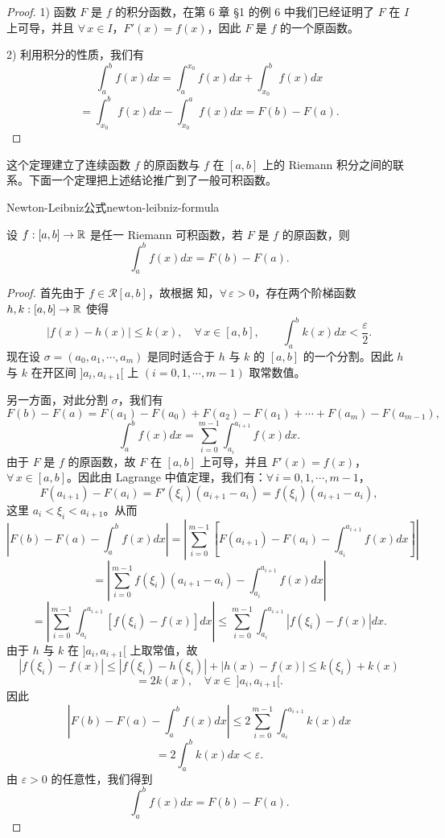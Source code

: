 \begin{proof}

	1) 函数 \(F\) 是 \(f\) 的积分函数，在第 6 章 §1 的例 6 中我们已经证明了 \(F\) 在 \(I\) 上可导，并且 \(\forall\,x\in I\)，\(F'(x)=f(x)\)，因此 \(F\) 是 \(f\) 的一个原函数。

	2) 利用积分的性质，我们有
	\[
	\int_a^b f(x)dx=\int_a^{x_0} f(x)dx+\int_{x_0}^b f(x)dx
	\]
	\[
	=\int_{x_0}^b f(x)dx-\int_{x_0}^a f(x)dx=F(b)-F(a).
	\]

\end{proof}

这个定理建立了连续函数 \(f\) 的原函数与 \(f\) 在 \([a,b]\) 上的 Riemann 积分之间的联系。下面一个定理把上述结论推广到了一般可积函数。

\begin{mythm}{Newton-Leibniz公式}{newton-leibniz-formula}

	设 \(f:[a,b]\to\mathbb{R}\) 是任一 Riemann 可积函数，若 \(F\) 是 \(f\) 的原函数，则
	\[
	\int_a^b f(x)dx=F(b)-F(a).
	\]

\end{mythm}

\begin{proof}

	首先由于 \(f\in\mathscr{R}[a,b]\)，故根据 知，\(\forall\,\varepsilon>0\)，存在两个阶梯函数 \(h,k:[a,b]\to\mathbb{R}\) 使得
	\[
	|f(x)-h(x)|\le k(x),\quad\forall\,x\in[a,b],\qquad\int_a^b k(x)dx<\frac{\varepsilon}{2}.
	\]
	现在设 \(\sigma=(a_0,a_1,\cdots,a_m)\) 是同时适合于 \(h\) 与 \(k\) 的 \([a,b]\) 的一个分割。因此 \(h\) 与 \(k\) 在开区间 \(]a_i,a_{i+1}[\) 上 \((i=0,1,\cdots,m-1)\) 取常数值。

	另一方面，对此分割 \(\sigma\)，我们有
	\[
	F(b)-F(a)=F(a_1)-F(a_0)+F(a_2)-F(a_1)+\cdots+F(a_m)-F(a_{m-1}),
	\]
	\[
	\int_a^b f(x)dx=\sum_{i=0}^{m-1}\int_{a_i}^{a_{i+1}}f(x)dx.
	\]
	由于 \(F\) 是 \(f\) 的原函数，故 \(F\) 在 \([a,b]\) 上可导，并且 \(F'(x)=f(x)\)，\(\forall\,x\in[a,b]\)。因此由 Lagrange 中值定理，我们有：\(\forall\,i=0,1,\cdots,m-1\)，
	\[
	F(a_{i+1})-F(a_i)=F'(\xi_i)(a_{i+1}-a_i)=f(\xi_i)(a_{i+1}-a_i),
	\]
	这里 \(a_i<\xi_i<a_{i+1}\)。从而
	\[
	\left|F(b)-F(a)-\int_a^b f(x)dx\right|
	=\left|\sum_{i=0}^{m-1}\left[F(a_{i+1})-F(a_i)-\int_{a_i}^{a_{i+1}}f(x)dx\right]\right|
	\]
	\[
	=\left|\sum_{i=0}^{m-1}f(\xi_i)(a_{i+1}-a_i)-\int_{a_i}^{a_{i+1}}f(x)dx\right|
	\]
	\[
	=\left|\sum_{i=0}^{m-1}\int_{a_i}^{a_{i+1}}[f(\xi_i)-f(x)]dx\right|
	\le\sum_{i=0}^{m-1}\int_{a_i}^{a_{i+1}}|f(\xi_i)-f(x)|dx.
	\]
	由于 \(h\) 与 \(k\) 在 \(]a_i,a_{i+1}[\) 上取常值，故
	\[
	|f(\xi_i)-f(x)|\le|f(\xi_i)-h(\xi_i)|+|h(x)-f(x)|\le k(\xi_i)+k(x)
	\]
	\[
	=2k(x),\quad\forall\,x\in\ ]a_i,a_{i+1}[.
	\]
	因此
	\[
	\left|F(b)-F(a)-\int_a^b f(x)dx\right|\le2\sum_{i=0}^{m-1}\int_{a_i}^{a_{i+1}}k(x)dx
	\]
	\[
	=2\int_a^b k(x)dx<\varepsilon.
	\]
	由 \(\varepsilon>0\) 的任意性，我们得到
	\[
	\int_a^b f(x)dx=F(b)-F(a).
	\]

\end{proof}

